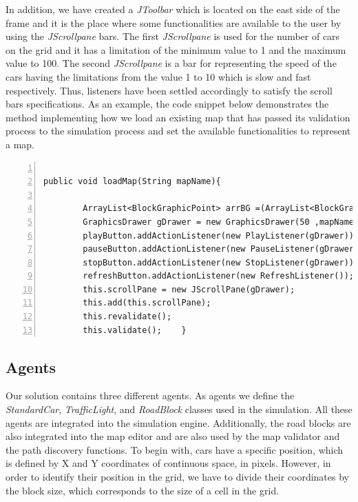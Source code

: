 \documentclass[oneside]{article}
\begin{document}
\noindent In addition, we have created a \textit{JToolbar} which is located on the east side of the frame and it is the place where some functionalities are available to the user by using the \textit{JScrollpane} bars. The first \textit{JScrollpane} is used for the number of cars on the grid and it has a limitation of the minimum value to 1 and the maximum value to 100. The second \textit{JScrollpane} is a bar for representing the speed of the cars having the limitations from the value 1 to 10 which is slow and fast respectively. Thus, listeners have been settled accordingly to satisfy the scroll bars specifications. As an example, the code snippet below demonstrates the method implementing how we load an existing map that has passed its validation process to the simulation process and set the available functionalities to represent a map. 
\lstset{language=Java, framexleftmargin=10pt, framexrightmargin=10pt, frame=single, breaklines=true, }          %
\begin{lstlisting}[numbers=left, numberstyle=\small, numbersep=8pt,  framexleftmargin=1pt, framexrightmargin=10pt ] 

public void loadMap(String mapName){
		
		ArrayList<BlockGraphicPoint> arrBG =(ArrayList<BlockGraphicPoint>) FileRW.readObject(MainConfig.ROADBLOCK_PATH+"/"+mapName+MainConfig.ROADBLOCK_GRAPHICS_SUFFIX);
		GraphicsDrawer gDrawer = new GraphicsDrawer(50 ,mapName, arrBG , ib );
		playButton.addActionListener(new PlayListener(gDrawer));
		pauseButton.addActionListener(new PauseListener(gDrawer));
		stopButton.addActionListener(new StopListener(gDrawer));
		refreshButton.addActionListener(new RefreshListener());
		this.scrollPane = new JScrollPane(gDrawer);
		this.add(this.scrollPane);
		this.revalidate();
		this.validate();	}

\end{lstlisting}


\subsection{Agents} 

Our solution contains three different agents. As agents we define the \textit{StandardCar}, \textit{TrafficLight}, and \textit{RoadBlock} classes used in the simulation. All these agents are integrated into the simulation engine. Additionally, the road blocks are also integrated into the map editor and are also used by the map validator and the path discovery functions. To begin with, cars have a specific position, which is defined by X and Y coordinates of continuous space, in pixels. However, in order to identify their position in the grid, we have to divide their coordinates by the block size, which corresponds to the size of a cell in the grid. 
\end{document}
